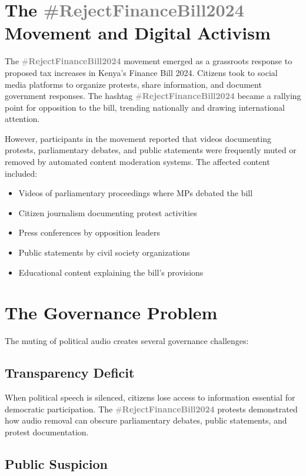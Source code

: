 \documentclass{article}
\newcommand{\rejectbill}{\textcolor{gray}{\#\textbf{RejectFinanceBill2024}}}
\begin{document}
\section{The \rejectbill{} Movement and Digital Activism}

The \rejectbill{} movement emerged as a grassroots response to proposed tax increases in Kenya's Finance Bill 2024. Citizens took to social media platforms to organize protests, share information, and document government responses. The hashtag \rejectbill{} became a rallying point for opposition to the bill, trending nationally and drawing international attention.

However, participants in the movement reported that videos documenting protests, parliamentary debates, and public statements were frequently muted or removed by automated content moderation systems. The affected content included:

\begin{itemize}
\item Videos of parliamentary proceedings where MPs debated the bill
\item Citizen journalism documenting protest activities
\item Press conferences by opposition leaders
\item Public statements by civil society organizations
\item Educational content explaining the bill's provisions
\end{itemize}

\section{The Governance Problem}

The muting of political audio creates several governance challenges:

\subsection{Transparency Deficit}

When political speech is silenced, citizens lose access to information essential for democratic participation. The \rejectbill{} protests demonstrated how audio removal can obscure parliamentary debates, public statements, and protest documentation.

\subsection{Public Suspicion}
\end{document}
